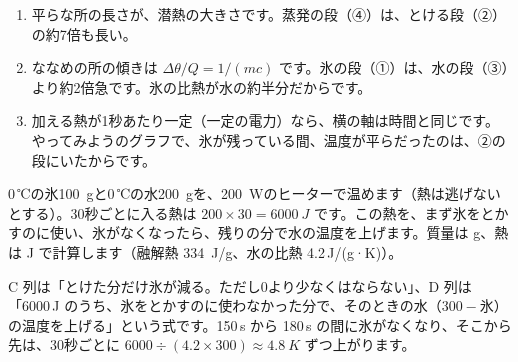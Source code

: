 \begin{enumerate}[label={\bkcircled{\arabic*}}, leftmargin=2.4\zw, itemsep=1pt, topsep=2pt]
\item 平らな所の長さが、潜熱の大きさです。蒸発の段（④）は、とける段（②）の約7倍も長い。
\item ななめの所の傾きは $\Delta\theta/Q=1/(mc)$ です。氷の段（①）は、水の段（③）より約2倍急です。氷の比熱が水の約半分だからです。
\item 加える熱が1秒あたり一定（一定の電力）なら、横の軸は時間と同じです。やってみようのグラフで、氷が残っている間、温度が平らだったのは、②の段にいたからです。
\end{enumerate}

0\,℃の氷\qty{100}{g}と0\,℃の水\qty{200}{g}を、\qty{200}{W}のヒーターで温めます（熱は逃げないとする）。30秒ごとに入る熱は $200\times30=\qty{6000}{J}$ です。この熱を、まず氷をとかすのに使い、氷がなくなったら、残りの分で水の温度を上げます。質量は g、熱は J で計算します（融解熱 \qty{334}{J/g}、水の比熱 4.2\,J/(g·K)）。
\begin{bkcenter}
\label{ph:熱-1:tab-sheet}
\end{bkcenter}
C 列は「とけた分だけ氷が減る。ただし0より少なくはならない」、D 列は「6000\,J のうち、氷をとかすのに使わなかった分で、そのときの水（$300-\text{氷}$）の温度を上げる」という式です。150\,s から 180\,s の間に氷がなくなり、そこから先は、30秒ごとに $6000\div(4.2\times300)\approx\qty{4.8}{K}$ ずつ上がります。

\begin{phmodel}[一定の電力で温める氷水]
\end{phmodel}

